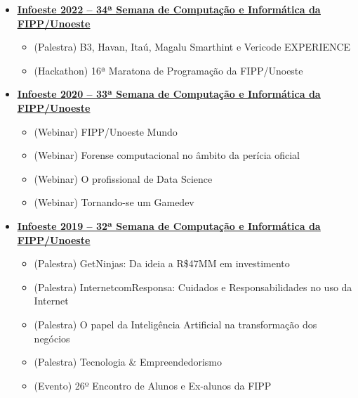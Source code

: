 \documentclass[letterpaper,11pt]{article}
\begin{document}
\begin{itemize}[leftmargin=0.15in, label={}]
    \item \small \textbf{\href{https://raw.githubusercontent.com/elvitin/curriculo/main/certs/infoeste/Certificado2022.pdf}{\underline{Infoeste 2022 -- 34ª Semana de Computação e Informática da FIPP/Unoeste}}}
    \begin{itemize}[itemsep=-5pt, parsep=3pt]
        \item\small (Palestra) B3, Havan, Itaú, Magalu Smarthint e Vericode EXPERIENCE
        \item\small (Hackathon) 16ª Maratona de Programação da FIPP/Unoeste
    \end{itemize}

    \item \small \textbf{\href{https://raw.githubusercontent.com/elvitin/curriculo/main/certs/infoeste/Certificado2020.pdf}{\underline{Infoeste 2020 -- 33ª Semana de Computação e Informática da FIPP/Unoeste}}}
    \begin{itemize}[itemsep=-5pt, parsep=3pt]
        \item\small (Webinar) FIPP/Unoeste Mundo
        \item\small (Webinar) Forense computacional no âmbito da perícia oficial
        \item\small (Webinar) O profissional de Data Science
        \item\small (Webinar) Tornando-se um Gamedev
    \end{itemize}

    \item \small \textbf{\href{https://raw.githubusercontent.com/elvitin/curriculo/main/certs/infoeste/Certificado2019.pdf}{\underline{Infoeste 2019 -- 32ª Semana de Computação e Informática da FIPP/Unoeste}}}
    \begin{itemize}[itemsep=-5pt, parsep=3pt]
        \item\small (Palestra) GetNinjas: Da ideia a R\$47MM em investimento
        \item\small (Palestra) InternetcomResponsa: Cuidados e Responsabilidades no uso da Internet
        \item\small (Palestra) O papel da Inteligência Artificial na transformação dos negócios
        \item\small (Palestra) Tecnologia \& Empreendedorismo
        \item\small (Evento) 26º Encontro de Alunos e Ex-alunos da FIPP
    \end{itemize}


\end{itemize}    
\end{document}
